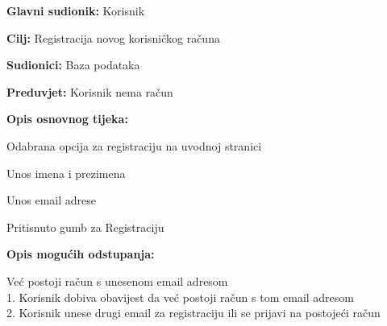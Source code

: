 					
					\noindent {}
					\begin{packed_item}
						\item \textbf{Glavni sudionik:} Korisnik
						\item \textbf{Cilj:} Registracija novog korisničkog računa
						\item \textbf{Sudionici:} Baza podataka
						\item \textbf{Preduvjet:} Korisnik nema račun
						\item \textbf{Opis osnovnog tijeka:}
						\begin{packed_enum}
							\item Odabrana opcija za registraciju na uvodnoj stranici
							\item Unos imena i prezimena
							\item Unos email adrese
							\item Pritisnuto gumb za Registraciju
						\end{packed_enum}
						\item \textbf{Opis mogućih odstupanja:}
						\begin{packed_item}
							\item[3.a] Već postoji račun s unesenom email adresom
							\\1. Korisnik dobiva obavijest da već postoji račun s tom email adresom
							\\2. Korisnik unese drugi email za registraciju ili se prijavi na postojeći račun
						\end{packed_item}
					\end{packed_item}
					
